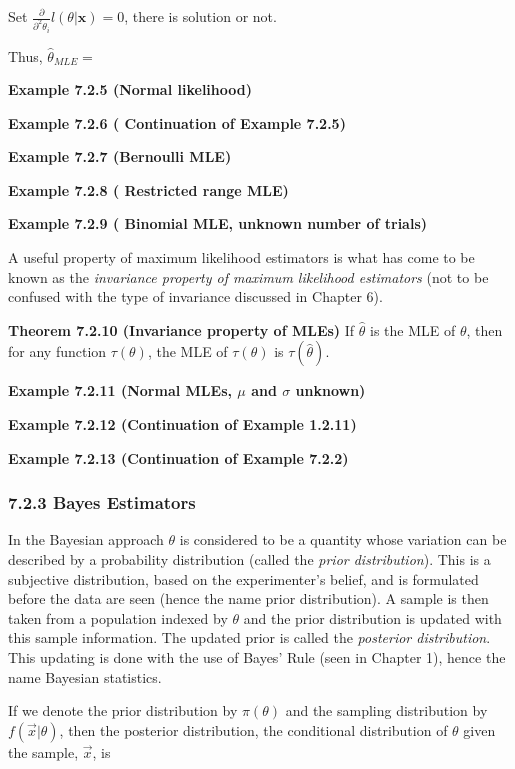 \documentclass[6pt,Portrait]{article}
\begin{document}
Set \(\frac{\partial}{\partial^2\theta_i}l(\theta|\mathbf{x})=0\), there
is solution or not.

Thus, \(\hat\theta_{MLE}=\)

\textbf{Example 7.2.5 (Normal likelihood)}

\textbf{Example 7.2.6 ( Continuation of Example 7.2.5)}

\textbf{Example 7.2.7 (Bernoulli MLE)}

\textbf{Example 7.2.8 ( Restricted range MLE)}

\textbf{Example 7.2.9 ( Binomial MLE, unknown number of trials)}

A useful property of maximum likelihood estimators is what has come to
be known as the \emph{invariance property of maximum likelihood
estimators} (not to be confused with the type of invariance discussed in
Chapter 6).

\textbf{Theorem 7.2.10 (Invariance property of MLEs)} If \(\hat\theta\)
is the MLE of \(\theta\), then for any function \(\tau(\theta)\), the
MLE of \(\tau(\theta)\) is \(\tau(\hat\theta)\).

\textbf{Example 7.2.11 (Normal MLEs, \(\mu\) and \(\sigma\) unknown)}

\textbf{Example 7.2.12 (Continuation of Example 1.2.11)}

\textbf{Example 7.2.13 (Continuation of Example 7.2.2)}

\hypertarget{BayesE}{%
\subsubsection{7.2.3 Bayes Estimators}\label{BayesE}}

In the Bayesian approach \(\theta\) is considered to be a quantity whose
variation can be described by a probability distribution (called the
\emph{prior distribution}). This is a subjective distribution, based on
the experimenter's belief, and is formulated before the data are seen
(hence the name prior distribution). A sample is then taken from a
population indexed by \(\theta\) and the prior distribution is updated
with this sample information. The updated prior is called the
\emph{posterior distribution}. This updating is done with the use of
Bayes' Rule (seen in Chapter 1), hence the name Bayesian statistics.

If we denote the prior distribution by \(\pi(\theta)\) and the sampling
distribution by \(f(\vec x|\theta)\), then the posterior distribution,
the conditional distribution of \(\theta\) given the sample, \(\vec x\),
is
\end{document}
